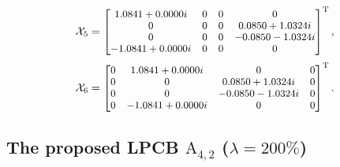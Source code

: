 \documentclass[journal]{IEEEtran}
\begin{document}
 \begin{equation}
  \footnotesize   
     \mathcal X_5=
\begin{bmatrix}
     1.0841 + 0.0000i&  0&  0& 0\\
   0&  0&  0&  0.0850 + 1.0324i\\
  0&  0&  0& -0.0850 - 1.0324i\\
  -1.0841 + 0.0000i&  0&  0&  0\\
      \end{bmatrix}^{\text{T}}, \notag
  \end{equation}
\begin{equation}
  \footnotesize   
     \mathcal X_6=
\begin{bmatrix}
     0&  1.0841 + 0.0000i& 0&  0\\
   0&  0&  0.0850 + 1.0324i&  0\\
   0& 0& -0.0850 - 1.0324i&  0\\
   0& -1.0841 + 0.0000i&  0&  0\\
      \end{bmatrix}^{\text{T}}. \notag
  \end{equation}
    
    
  
  \subsection{The proposed LPCB $\text{A}_{4,2}$ ($\lambda = 200\%$)}
    \vspace{-0.5em}

  
  
    
\end{document}
